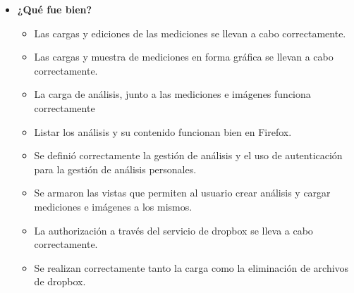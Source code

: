  	\begin{itemize}
 		\item \textbf{¿Qué fue bien?}
 		\begin{itemize}
 			\item        Las cargas y ediciones de las mediciones se llevan a cabo correctamente.		
			\item        Las cargas y muestra de mediciones en forma gráfica se llevan a cabo correctamente.			
			\item La carga de análisis, junto a las mediciones e imágenes funciona correctamente
			\item Listar los análisis y su contenido funcionan bien en Firefox.
			\item Se definió correctamente la gestión de análisis y el uso de autenticación para la gestión de análisis personales.
			\item Se armaron las vistas que permiten al usuario crear análisis y cargar mediciones e imágenes a los mismos.			
			\item La authorización a través del servicio de dropbox se lleva a cabo correctamente.
			\item Se realizan correctamente tanto la carga como la eliminación de archivos de dropbox.			
 		\end{itemize}
 		

\end{itemize}

